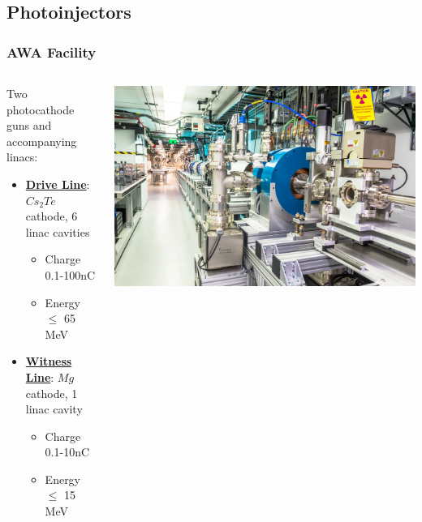 \documentclass[professionalfonts,t]{beamer}
\begin{document}
\subsection{Photoinjectors}
\begin{frame}[t]
\frametitle{AWA Facility}
\begin{columns}[T] %
	\begin{column}{.48\textwidth}
		
			Two photocathode guns and accompanying linacs:
			\begin{itemize}
				\item{\underline{\textbf{Drive Line}}: $Cs_2Te$ cathode, 6 linac cavities}
				\begin{itemize}
					\item{Charge 0.1-100nC}
					\item{Energy $\leq$ 65 MeV}
					
				\end{itemize}
				\item{\underline{\textbf{Witness Line}}: $Mg$ cathode, 1 linac cavity}
				\begin{itemize}
					\item{Charge 0.1-10nC}
					\item{Energy $\leq$ 15 MeV}
				\end{itemize}
			\end{itemize}
	\end{column}%
	\hfill%
	\begin{column}{.48\textwidth}
		\includegraphics[width=1.0\linewidth, right]{../images/drive_gun}
	\end{column}%
\end{columns}
\end{frame}
\end{document}
